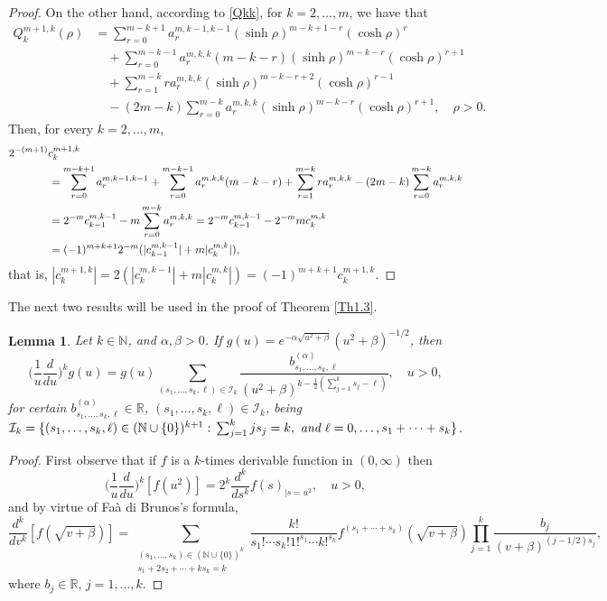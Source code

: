 \documentclass[a4paper,10pt, reqno]{amsart}
\newtheorem{lem}[thm]{Lemma}
\theoremstyle{definition}
\theoremstyle{remark}
\numberwithin{equation}{section}
\begin{document}
{\begin{proof}
On the other hand, according to \eqref{Qkk}, for $k=2,\ldots, m$, we have that
\begin{align*}
Q_k^{m+1,k}(\rho )&=\sum_{r=0}^{m-k+1}a_r^{m,k-1,k-1}(\sinh \rho )^{m-k+1-r}(\cosh \rho )^r\\
&\quad +\sum_{r=0}^{m-k-1}a_r^{m,k,k}(m-k-r)(\sinh \rho )^{m-k-r}(\cosh \rho )^{r+1}\\
&\quad +\sum_{r=1}^{m-k}ra_r^{m,k,k}(\sinh \rho )^{m-k-r+2}(\cosh \rho )^{r-1}\\
&\quad -(2m-k)\sum_{r=0}^{m-k}a_r^{m,k,k}(\sinh \rho )^{m-k-r}(\cosh \rho )^{r+1},\quad \rho >0.
\end{align*}
Then, for every $k=2,\ldots, m$,
\begin{align*}
    2^{-(m+1)}c_k^{m+1,k}&\\
    &\hspace{-1cm}=\sum_{r=0}^{m-k+1}a_r^{m,k-1,k-1}+\sum_{r=0}^{m-k-1}a_r^{m,k,k}(m-k-r)+\sum_{r=1}^{m-k}ra_r^{m,k,k}-(2m-k)\sum_{r=0}^{m-k}a_r^{m,k,k}\\
    &\hspace{-1cm}=2^{-m}c_{k-1}^{m,k-1}-m\sum_{r=0}^{m-k}a_r^{m,k,k}=2^{-m}c_{k-1}^{m,k-1}-2^{-m}mc_k^{m,k}\\\
    &\hspace{-1cm}=(-1)^{m+k+1}2^{-m}(|c_{k-1}^{m,k-1}|+m|c_k^{m,k}|),
\end{align*}
that is, $|c_k^{m+1,k}|=2(|c_k^{m,k-1}|+m|c_k^{m,k}|)=(-1)^{m+k+1}c_k^{m+1,k}$. 
\end{proof}
The next two results will be used in the proof of Theorem \ref{Th1.3}.
\begin{lem}\label{FadiBruno}
    Let $k\in \mathbb N$, and $\alpha,\beta>0$. If $g(u)=e^{-\alpha\sqrt{u^2+\beta}}(u^2+\beta)^{-1/2}$, then
    $$
    \Big(\frac{1}{u}\frac{d}{du}\Big)^kg(u)=g(u)\sum_{(s_1,\ldots, s_k,\ell)\in \mathcal I_k}\frac{b_{s_1,\ldots, s_k,\ell}^{(\alpha)}}{(u^2+\beta)^{k-\frac{1}{2}(\sum_{j=1}^ks_j-\ell)}},\quad u>0,
    $$
    for certain $b_{s_1,\ldots, s_k,\ell}^{(\alpha)}\in \mathbb R$, $(s_1,\ldots, s_k,\ell )\in \mathcal I_k$, being $\mathcal I_k=\{(s_1,\ldots, s_k,\ell)\in (\mathbb N\cup \{0\})^{k+1}: \,\sum_{j=1}^kjs_j=k, \mbox{ \it and }\ell =0,\ldots, s_1+\cdots+s_k\}$. 
\end{lem}
\begin{proof}
First observe that if $f$ is a $k$-times derivable function in $(0,\infty)$ then 
$$
\Big(\frac{1}{u}\frac{d}{du}\Big)^k[f(u^2)]=2^k\frac{d^k}{ds^k}f(s)_{|s=u^2},\quad u>0,
$$ 
and by virtue of Fa\`a di Brunos's formula, 
$$
\frac{d^k}{dv^k}[f(\sqrt{v+\beta})]=\sum_{\substack{(s_1,\ldots, s_k)\in (\mathbb N\cup\{0\})^k\\s_1+2s_2+\cdots+ks_k=k}}\frac{k!}{s_1!\cdots s_k!1!^{s_1}\cdots k!^{s_k}}f^{(s_1+\cdots +s_k)}(\sqrt{v+\beta})\prod_{j=1}^k\frac{b_j}{(v+\beta)^{(j-1/2)s_j}},
$$
where $b_j\in \mathbb R$, $j=1,\ldots, k$.


\end{proof}}
\end{document}

